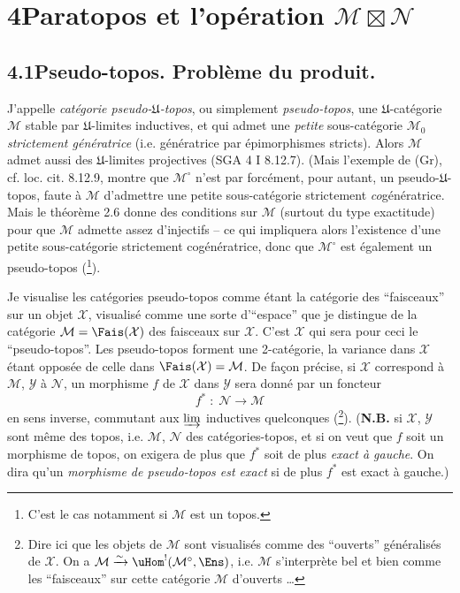 

\section*{4\quad Paratopos et l'opération $\mathcal{M}\boxtimes\mathcal{N}$}

\subsection*{4.1\quad Pseudo-topos. Problème du produit.}

J'appelle \textit{catégorie pseudo-$\mathfrak{U}$-topos}, ou simplement \textit{pseudo-topos}, une $\mathfrak{U}$-catégorie $\mathcal{M}$ stable par $\mathfrak{U}$-limites inductives, et qui admet une \textit{petite} sous-catégorie $\mathcal{M}_0$ \textit{strictement génératrice} (i.e. génératrice par épimorphismes stricts). Alors $\mathcal{M}$ admet aussi des $\mathfrak{U}$-limites projectives (SGA 4 I 8.12.7). (Mais l'exemple de (Gr), cf. loc. cit. 8.12.9, montre que $\mathcal{M}^\circ$ n'est par forcément, pour autant, un pseudo-$\mathfrak{U}$-topos, faute à $\mathcal{M}$ d'admettre une petite sous-catégorie strictement \textit{co}génératrice. Mais le théorème 2.6 donne des conditions sur $\mathcal{M}$ (surtout du type exactitude) %
pour que $\mathcal{M}$ admette assez d'injectifs -- ce qui impliquera alors l'existence d'une petite sous-catégorie strictement cogénératrice, donc que $\mathcal{M}^\circ$ est également un pseudo-topos (\footnote{C'est le cas notamment si $\mathcal{M}$ est un topos.}).

Je visualise les catégories pseudo-topos comme étant la catégorie des “faisceaux” sur un objet $\mathcal{X}$, visualisé comme une sorte d'“espace” que je distingue de la catégorie $\mathcal{M}=\Fais(\mathcal{X})$ des faisceaux sur $\mathcal{X}$. C'est $\mathcal{X}$ qui sera pour ceci le “pseudo-topos”. Les pseudo-topos forment une 2-catégorie, la variance dans $\mathcal{X}$ étant opposée de celle dans $\Fais(\mathcal{X})=\mathcal{M}$. De façon précise, si $\mathcal{X}$ correspond à $\mathcal{M}$, $\mathcal{Y}$ à $\mathcal{N}$, un morphisme $f$ de $\mathcal{X}$ dans $\mathcal{Y}$ sera donné par un foncteur
\[
f^* \;:\; \mathcal{N} \longrightarrow \mathcal{M}
\tag*{(4.1.1)}
\]
en sens inverse, commutant aux $\varinjlim$ inductives quelconques (\footnote{Dire ici que les objets de $\mathcal{M}$ sont visualisés comme des “ouverts” généralisés de $\mathcal{X}$. On a $\mathcal{M}\xrightarrow{\sim}\uHom^!(\mathcal{M}^\circ,\Ens)$, i.e. $\mathcal{M}$ s'interprète bel et bien comme les “faisceaux” sur cette catégorie $\mathcal{M}$ d'ouverts \ldots}). (\textbf{N.B.} si $\mathcal{X}$, $\mathcal{Y}$ sont même des topos, i.e. $\mathcal{M}$, $\mathcal{N}$ des catégories-topos, et si on veut que $f$ soit un morphisme de topos, on exigera de plus que $f^*$ soit de plus \textit{exact à gauche}. On dira qu'un \textit{morphisme de pseudo-topos est exact} si de plus $f^*$ est exact à gauche.)

